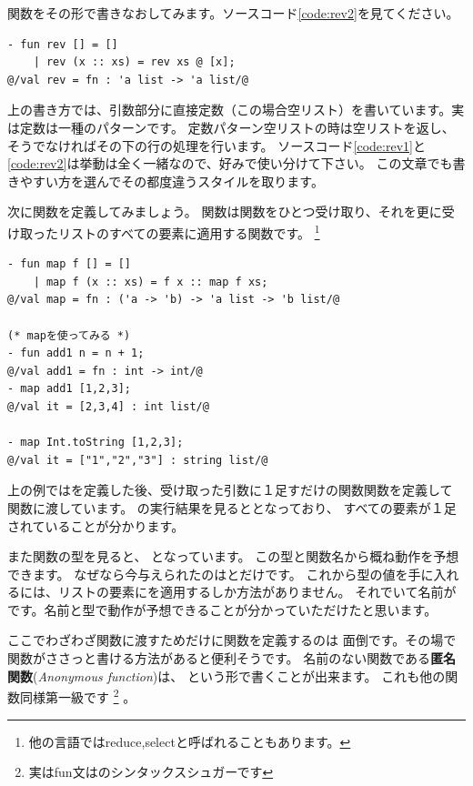 \documentclass[11pt,a4paper]{jarticle}
\begin{document}
関数をその形で書きなおしてみます。ソースコード\ref{code:rev2}を見てください。

\begin{lstlisting}[caption=引数部分でのパターンマッチ,label=code:rev2]
- fun rev [] = []
    | rev (x :: xs) = rev xs @ [x];
@/val rev = fn : 'a list -> 'a list/@
\end{lstlisting}

上の書き方では、引数部分に直接定数（この場合空リスト）を書いています。実は定数は一種のパターンです。
定数パターン空リストの時は空リストを返し、そうでなければその下の行の処理を行います。
ソースコード\ref{code:rev1}と\ref{code:rev2}は挙動は全く一緒なので、好みで使い分けて下さい。
この文章でも書きやすい方を選んでその都度違うスタイルを取ります。

次に関数を定義してみましょう。
関数は関数をひとつ受け取り、それを更に受け取ったリストのすべての要素に適用する関数です。
\footnote{他の言語ではreduce,selectと呼ばれることもあります。}

\begin{lstlisting}[caption=関数fとリストlを受け取り、lの要素全てにfを適用する関数, label=code:map]
- fun map f [] = []
    | map f (x :: xs) = f x :: map f xs;
@/val map = fn : ('a -> 'b) -> 'a list -> 'b list/@

(* mapを使ってみる *)
- fun add1 n = n + 1;
@/val add1 = fn : int -> int/@
- map add1 [1,2,3];
@/val it = [2,3,4] : int list/@

- map Int.toString [1,2,3];
@/val it = ["1","2","3"] : string list/@
\end{lstlisting}

上の例ではを定義した後、受け取った引数に１足すだけの関数関数を定義して
関数に渡しています。
の実行結果を見ると\prog{[2,3,4]}となっており、
すべての要素が１足されていることが分かります。

また関数の型を見ると、
となっています。
この型と関数名から概ね動作を予想できます。
なぜなら今与えられたのはとだけです。
これから型の値を手に入れるには、リストの要素にを適用するしか方法がありません。
それでいて名前がです。名前と型で動作が予想できることが分かっていただけたと思います。

ここでわざわざ関数に渡すためだけに関数を定義するのは
面倒です。その場で関数がささっと書ける方法があると便利そうです。
名前のない関数である{\bfseries 匿名関数}({\itshape Anonymous function})は、
という形で書くことが出来ます。
これも他の関数同様第一級です
\footnote{実はfun文はのシンタックスシュガーです}
。
\end{document}
